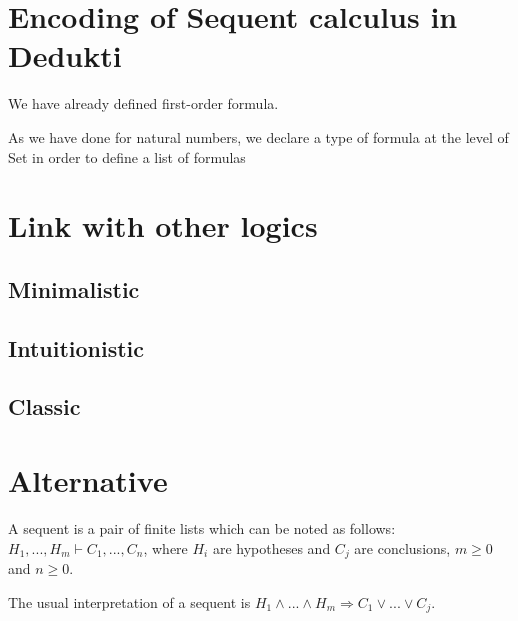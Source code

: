 \documentclass{article}
\begin{document}
\newpage
	
	\section{Encoding of Sequent calculus in Dedukti}\label{Sect:SC-in-dedukti}
	
	We have already defined first-order formula.
	
	As we have done for natural numbers, we declare a type of formula at the level of Set in order to define a list of formulas
	
	
	
	
	
	
	
	
	
	
	
	\section{Link with other logics}
	
	\subsection{Minimalistic}
	
	\subsection{Intuitionistic}
	
	\subsection{Classic}
	
	
	\section{Alternative}
	
	A sequent is a pair of finite lists which can be noted as follows: $H_1,...,H_m \vdash C_1,...,C_n$, where $H_i$ are hypotheses and $C_j$ are conclusions, $m \ge 0$ and $n \ge 0$.
	
	The usual interpretation of a sequent is
	$H_1 \land ... \land H_m \Rightarrow C_1 \lor ... \lor C_j$.
	
\end{document}

